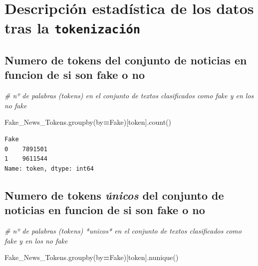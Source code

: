 \documentclass[
  11pt,
  a4paper,
]{article}
\newenvironment{Shaded}{\begin{snugshade}}{\end{snugshade}}
\newcommand{\CommentTok}[1]{\textcolor[rgb]{0.56,0.35,0.01}{\textit{#1}}}
\newcommand{\NormalTok}[1]{#1}
\newcommand{\OperatorTok}[1]{\textcolor[rgb]{0.81,0.36,0.00}{\textbf{#1}}}
\newcommand{\StringTok}[1]{\textcolor[rgb]{0.31,0.60,0.02}{#1}}
\begin{document}
\newpage

\hypertarget{descripciuxf3n-estaduxedstica-de-los-datos-tras-la-tokenizaciuxf3n}{%
\section{\texorpdfstring{Descripción estadística de los datos tras la
\texttt{tokenización}}{Descripción estadística de los datos tras la tokenización}}\label{descripciuxf3n-estaduxedstica-de-los-datos-tras-la-tokenizaciuxf3n}}

\hypertarget{numero-de-tokens-del-conjunto-de-noticias-en-funcion-de-si-son-fake-o-no}{%
\subsection{Numero de tokens del conjunto de noticias en funcion de si
son fake o
no}\label{numero-de-tokens-del-conjunto-de-noticias-en-funcion-de-si-son-fake-o-no}}

\begin{Shaded}
\begin{Highlighting}[]
\CommentTok{\# nº de palabras (tokens) en el conjunto de textos clasificados como fake y en los no fake}

\NormalTok{Fake\_News\_Tokens.groupby(by}\OperatorTok{=}\StringTok{\textquotesingle{}Fake\textquotesingle{}}\NormalTok{)[}\StringTok{\textquotesingle{}token\textquotesingle{}}\NormalTok{].count()}
\end{Highlighting}
\end{Shaded}

\begin{verbatim}
Fake
0    7891501
1    9611544
Name: token, dtype: int64
\end{verbatim}

\hypertarget{numero-de-tokens-uxfanicos-del-conjunto-de-noticias-en-funcion-de-si-son-fake-o-no}{%
\subsection{\texorpdfstring{Numero de tokens \emph{únicos} del conjunto
de noticias en funcion de si son fake o
no}{Numero de tokens únicos del conjunto de noticias en funcion de si son fake o no}}\label{numero-de-tokens-uxfanicos-del-conjunto-de-noticias-en-funcion-de-si-son-fake-o-no}}

\begin{Shaded}
\begin{Highlighting}[]
\CommentTok{\# nº de palabras (tokens) *unicos* en el conjunto de textos clasificados como fake y en los no fake}

\NormalTok{Fake\_News\_Tokens.groupby(by}\OperatorTok{=}\StringTok{\textquotesingle{}Fake\textquotesingle{}}\NormalTok{)[}\StringTok{\textquotesingle{}token\textquotesingle{}}\NormalTok{].nunique()}
\end{Highlighting}
\end{Shaded}
\end{document}
